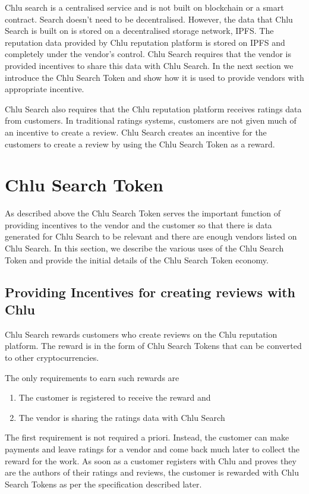 \documentclass[a4paper]{article}
\begin{document}
Chlu search is a centralised service and is not built on blockchain or
a smart contract. Search doesn't need to be decentralised. However,
the data that Chlu Search is built on is stored on a decentralised
storage network, IPFS. The reputation data provided by Chlu reputation
platform is stored on IPFS and completely under the vendor's
control. Chlu Search requires that the vendor is provided incentives
to share this data with Chlu Search. In the next section we introduce
the Chlu Search Token and show how it is used to provide vendors with
appropriate incentive.

Chlu Search also requires that the Chlu reputation platform receives
ratings data from customers. In traditional ratings systems, customers
are not given much of an incentive to create a review. Chlu Search
creates an incentive for the customers to create a review by using the
Chlu Search Token as a reward.

\section{Chlu Search Token}

As described above the Chlu Search Token serves the important function
of providing incentives to the vendor and the customer so that there
is data generated for Chlu Search to be relevant and there are enough
vendors listed on Chlu Search. In this section, we describe the
various uses of the Chlu Search Token and provide the initial details
of the Chlu Search Token economy.

\subsection{Providing Incentives for creating reviews with Chlu}

Chlu Search rewards customers who create reviews on the Chlu
reputation platform. The reward is in the form of Chlu Search Tokens
that can be converted to other cryptocurrencies.

The only requirements to earn such rewards are

\begin{enumerate}
\item The customer is registered to receive the reward and
\item The vendor is sharing the ratings data with Chlu Search
\end{enumerate}

The first requirement is not required a priori. Instead, the customer
can make payments and leave ratings for a vendor and come back much
later to collect the reward for the work. As soon as a customer
registers with Chlu and proves they are the authors of their ratings
and reviews, the customer is rewarded with Chlu Search Tokens as per
the specification described later.
\end{document}
